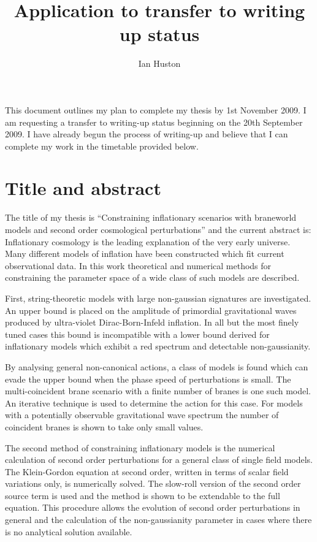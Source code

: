\documentclass[a4paper,11pt]{article}
\title{Application to transfer to writing up status}
\author{Ian Huston}
\begin{document}
\maketitle

This document outlines my plan to complete my thesis by 1st November 2009. I am requesting a
transfer to writing-up status beginning on the 20th September 2009. I have already begun the
process of writing-up and believe that I can complete my work in the timetable provided below. 

\section*{Title and abstract}
The title of my thesis is ``Constraining inflationary scenarios with braneworld models and second
order cosmological perturbations'' and the current
abstract is:
\\

Inflationary cosmology is the leading explanation of the very early universe. 
Many different models of inflation have been constructed which fit current observational data.
In this work theoretical and numerical methods for constraining the parameter space of a wide class
of such models are described.

First, string-theoretic models with large non-gaussian signatures are investigated.
An upper bound is placed on the amplitude of primordial gravitational waves produced by ultra-violet
Dirac-Born-Infeld inflation. In all but the most finely tuned cases this bound is incompatible with
a lower bound derived for inflationary models which exhibit a red spectrum and detectable
non-gaussianity. 


By analysing general non-canonical actions, a class of models is found which can
evade the upper bound when the phase speed of perturbations is small. The multi-coincident brane
scenario with a finite number of branes is one such model. An iterative technique is used to
determine the action for this case.
For models with a potentially observable gravitational wave spectrum the number of coincident
branes is
shown to take only small values. 

The second method of constraining inflationary models is the numerical calculation
of second order perturbations for a general class of single field models.
 The Klein-Gordon equation at second order, written in terms
of scalar field variations only, is numerically solved. 
The slow-roll version of the second order source term is used and the method is
shown to be extendable to the full equation.
This procedure allows the evolution of second order
perturbations in general and the calculation of the non-gaussianity parameter in cases
where there is no analytical solution available.  
\end{document}
